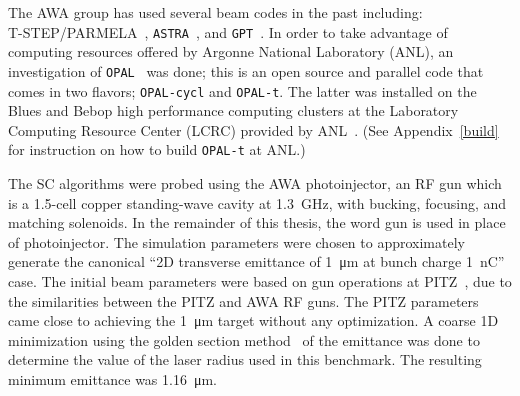 The AWA group has used several beam codes in the past including:\\
\mbox{T-STEP/PARMELA}~\cite{parmela}, \verb|ASTRA|~\cite{astra}, and \verb|GPT|~\cite{gpt}.  
In order to take advantage of computing resources offered by 
Argonne National Laboratory (ANL), an investigation of 
\verb|OPAL|~\cite{opal} was done; this is an open source and parallel code that comes in two flavors;  
\verb|OPAL-cycl| and \verb|OPAL-t|. The latter was installed on the Blues and Bebop high performance computing clusters
at the Laboratory Computing Resource Center (LCRC) provided by ANL~\cite{lcrc}.
(See Appendix~\ref{build} for instruction on how to build \verb|OPAL-t| at ANL.)

The SC algorithms were probed using the AWA photoinjector, 
an RF gun which is a 1.5-cell copper standing-wave cavity at \SI{1.3}{GHz}, 
with bucking, focusing, and matching solenoids. 
In the remainder of this thesis, the word gun is used 
in place of photoinjector. The simulation parameters were chosen to 
approximately generate the canonical ``2D transverse emittance of
\SI{1}{\micro\metre} at bunch charge \SI{1}{nC}'' case.  
The initial beam parameters were based on gun operations at PITZ~\cite{pitz},
due to the similarities between the PITZ and AWA RF guns.
The PITZ parameters came close to achieving the \SI{1}{\micro\metre}
target without any optimization. A coarse 1D minimization
using the golden section method~\cite{golden} of the 
emittance was done to determine the value of the laser radius 
used in this benchmark. The resulting minimum emittance was   
\SI{1.16}{\micro\metre}. 

